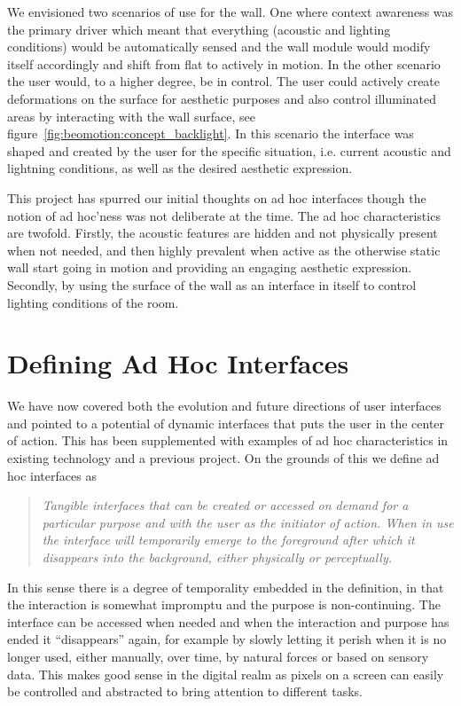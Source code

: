 We envisioned two scenarios of use for the wall.
One where context awareness was the primary driver which meant that everything (acoustic and lighting conditions) would be automatically sensed and the wall module would modify itself accordingly and shift from flat to actively in motion.
In the other scenario the user would, to a higher degree, be in control.
The user could actively create deformations on the surface for aesthetic purposes and also control illuminated areas by interacting with the wall surface, see figure~\ref{fig:beomotion:concept_backlight}.
In this scenario the interface was shaped and created by the user for the specific situation, i.e. current acoustic and lightning conditions, as well as the desired aesthetic expression. 

This project has spurred our initial thoughts on ad hoc interfaces though the notion of ad hoc'ness was not deliberate at the time.
The ad hoc characteristics are twofold.
Firstly, the acoustic features are hidden and not physically present when not needed, and then highly prevalent when active as the otherwise static wall start going in motion and providing an engaging aesthetic expression.
Secondly, by using the surface of the wall as an interface in itself to control lighting conditions of the room. 

\section{Defining Ad Hoc Interfaces} 

We have now covered both the evolution and future directions of user interfaces and pointed to a potential of dynamic interfaces that puts the user in the center of action.
This has been supplemented with examples of ad hoc characteristics in existing technology and a previous project.
On the grounds of this we define ad hoc interfaces as 

\begin{quotation}\label{adhoc:definition}
\emph{Tangible interfaces that can be created or accessed on demand for a particular purpose and with the user as the initiator of action. When in use the interface will temporarily emerge to the foreground after which it disappears into the background, either physically or perceptually.}
\end{quotation}

In this sense there is a degree of temporality embedded in the definition, in that the interaction is somewhat impromptu and the purpose is non-continuing.
The interface can be accessed when needed and when the interaction and purpose has ended it ``disappears'' again, for example by slowly letting it perish when it is no longer used, either manually, over time, by natural forces or based on sensory data.
This makes good sense in the digital realm as pixels on a screen can easily be controlled and abstracted to bring attention to different tasks.

